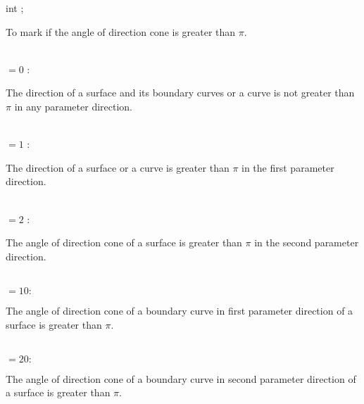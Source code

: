  \> int         ; \>\> \begin{minipg2}
                                To mark if the angle of direction cone
                                is greater than $\pi$.
                                \end{minipg2}\\
                \>\>\>\>\>      $= 0$   :\>\hspace*{0.3em}\begin{minipg5}
                                The direction of a surface
                                and its boundary curves or a curve
                                is not greater than $\pi$ in any
                                parameter direction.
                                \end{minipg5}\\[0.3ex]
                \>\>\>\>\>      $= 1$   :\>\hspace*{0.3em}\begin{minipg5}
                                The direction of a surface or a curve
                                is greater than $\pi$ in the first
                                parameter direction.
                                \end{minipg5}\\[0.8ex]
                \>\>\>\>\>      $= 2$   :\>\hspace*{0.3em}\begin{minipg5}
                                The angle of direction cone of a surface is greater
                                than $\pi$ in the second parameter
                                direction.
                                \end{minipg5}\\[0.8ex]
                \>\>\>\>\>      $= 10:$\>\hspace*{0.3em}\begin{minipg5}
                                The angle of direction cone of a boundary curve
                                in first parameter direction of a
                                surface is greater than $\pi$.
                                \end{minipg5}\\[0.8ex]
                \>\>\>\>\>      $= 20:$\>\hspace*{0.3em}\begin{minipg5}
                                The angle of direction cone of a boundary curve
                                in second parameter direction of a
                                surface is greater than $\pi$.
                                \end{minipg5}\\[0.3ex]
